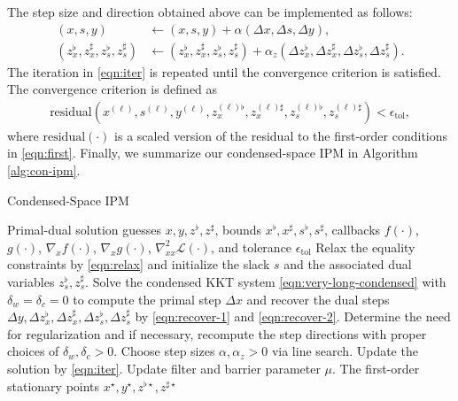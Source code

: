 The step size and direction obtained above can be implemented as follows:
\begin{align}
  (x,s,y) &\leftarrow (x,s,y)+ \alpha (\Delta x, \Delta s, \Delta y),\label{eqn:iter}\\\nonumber
  (z_x^\flat, z_x^\sharp, z_s^\flat, z_s^\sharp) &\leftarrow (z_x^\flat, z_x^\sharp, z_s^\flat, z_s^\sharp) + \alpha_z (\Delta z_x^\flat, \Delta z_x^\sharp, \Delta z_s^\flat, \Delta z_s^\sharp).
\end{align}
The iteration in \eqref{eqn:iter} is repeated until the convergence
criterion is satisfied. The convergence criterion is defined as
\begin{align}\label{eqn:criteria}
\text{residual}(x^{(\ell)}, s^{(\ell)}, y^{(\ell)},
z^{(\ell)\flat}_x, z^{(\ell)\sharp}_x, z^{(\ell)\flat}_s,
z^{(\ell)\sharp}_s) <\epsilon_{\text{tol}},
\end{align}
where
$\text{residual}(\cdot)$ is a scaled version of the residual to the
first-order conditions in \eqref{eqn:first}. Finally, we summarize our
condensed-space IPM in Algorithm \ref{alg:con-ipm}.

\begin{algorithm}[t]
  \caption{Condensed-Space IPM}
  \label{alg:con-ipm}
  \begin{algorithmic}[1]
    \REQUIRE Primal-dual solution guesses $x,y, z^\flat, z^\sharp$, bounds $x^\flat,x^\sharp, s^\flat, s^\sharp$, callbacks $f(\cdot)$, $g(\cdot)$, $\nabla_x f(\cdot)$, $\nabla_x g(\cdot)$, $\nabla^2_{xx} \mathcal{L}(\cdot)$, and tolerance $\epsilon_{\text{tol}}$
    \STATE Relax the equality constraints by \eqref{eqn:relax} and initialize the slack $s$ and the associated dual variables $z^\flat_s, z^\sharp_s$.
    \STATE Solve the condensed KKT system \eqref{eqn:very-long-condensed} with $\delta_w=\delta_c=0$ to compute the primal step $\Delta x$ and recover the dual steps $\Delta y, \Delta z_x^\flat, \Delta z_x^\sharp, \Delta z_s^\flat, \Delta z_s^\sharp$ by \eqref{eqn:recover-1} and \eqref{eqn:recover-2}.
    \STATE Determine the need for regularization and if necessary, recompute the step directions with proper choices of $\delta_w,\delta_c>0$.
    \STATE Choose step sizes $\alpha,\alpha_z>0$ via line search.
    \STATE Update the solution by \eqref{eqn:iter}.
    \STATE Update filter and barrier parameter $\mu$.
    \ENDWHILE
    \RETURN The first-order stationary points $x^\star,y^\star, z^{\flat\star}, z^{\sharp\star}$
  \end{algorithmic}
\end{algorithm}

